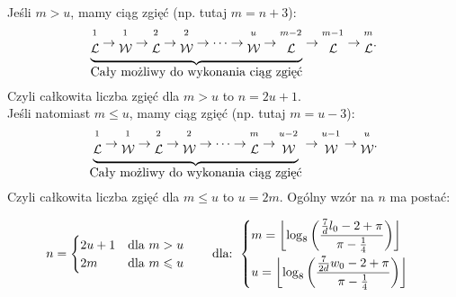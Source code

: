 		Jeśli $m>u$, mamy ciąg zgięć (np. tutaj $m=n+3$):
		\begin{gather*}
			\underbrace{\stackon{\mathcal{L}}{^1} \rightarrow \stackon{\mathcal{W}}{^1} \rightarrow \stackon{\mathcal{L}}{^2} \rightarrow \stackon{\mathcal{W}}{^2} \rightarrow \dots \rightarrow \stackon{\mathcal{W}}{^u} \rightarrow \stackon{\mathcal{L}}{^{m-2}}}_{\mbox{Cały możliwy do wykonania ciąg zgięć}} \rightarrow \stackon{\mathcal{L}}{^{m-1}} \rightarrow \stackon{\mathcal{L}}{^m}.
		\end{gather*}
		Czyli całkowita liczba zgięć dla $m>u$ to $n = 2u + 1$.\\
		Jeśli natomiast $m\leq u$, mamy ciąg zgięć (np. tutaj $m=u-3$):
		\begin{gather*}
			\underbrace{\stackon{\mathcal{L}}{^1} \rightarrow \stackon{\mathcal{W}}{^1} \rightarrow \stackon{\mathcal{L}}{^2} \rightarrow \stackon{\mathcal{W}}{^2} \rightarrow \dots \rightarrow \stackon{\mathcal{L}}{^m} \rightarrow \stackon{\mathcal{W}}{^{u-2}}}_{\mbox{Cały możliwy do wykonania ciąg zgięć}} \rightarrow \stackon{\mathcal{W}}{^{u-1}} \rightarrow \stackon{\mathcal{W}}{^u}.
		\end{gather*}	
	Czyli całkowita liczba zgięć dla $m\leq u$ to $u = 2m$.
	Ogólny wzór na $n$ ma postać:
	\begin{tcolorbox}[lower separated=false, colback=white, colframe=magenta, fonttitle=\bfseries, colbacktitle=black, coltitle=white]
		$$
			n = \begin{cases}
				2u + 1 & \mbox{dla } m>u\\
				2m & \mbox{dla } m\leq u
			\end{cases}\qquad
			\text{dla: }\begin{cases}
				m =  \left\lfloor\log_8\left(\dfrac{\frac{7}{d}l_0 - 2 + \pi}{\pi - \frac{1}{4}}\right)\right\rfloor\smallskip\\
				u = \left\lfloor\log_8\left(\dfrac{\frac{7}{2d}w_0 - 2 + \pi}{\pi - \frac{1}{4}}\right)\right\rfloor
			\end{cases}
		$$
	\end{tcolorbox}
	
